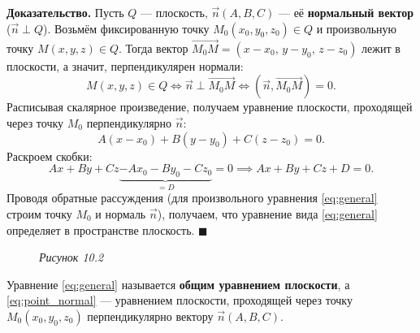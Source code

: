 \documentclass[12pt,a4paper]{article}
\newenvironment{myproof}{\noindent\textbf{Доказательство.}}{\hfill$\blacksquare$}
\begin{document}
\begin{myproof}
  Пусть $Q$ --- плоскость, $\vec{n}(A,B,C)$ --- её \textbf{нормальный
  вектор} ($\vec{n} \perp Q$). Возьмём фиксированную точку
  $M_0(x_0,y_0,z_0) \in Q$ и произвольную точку $M(x,y,z) \in Q$. Тогда
  вектор $\overrightarrow{M_0M} = (x-x_0,\, y-y_0,\, z-z_0)$ лежит в
  плоскости, а значит, перпендикулярен нормали:
  \[
    M(x,y,z) \in Q \iff \vec{n} \perp \overrightarrow{M_0M} \iff
    (\vec{n}, \overrightarrow{M_0M}) = 0.
  \]
  Расписывая скалярное произведение, получаем уравнение плоскости,
  проходящей через точку $M_0$ перпендикулярно $\vec{n}$:
  \begin{equation}
    A(x - x_0) + B(y - y_0) + C(z - z_0) = 0.
    \tag{10.2}\label{eq:point_normal}
  \end{equation}
  Раскроем скобки:
  \[
    Ax + By + Cz \underbrace{- Ax_0 - By_0 - Cz_0}_{= D} = 0
    \implies Ax + By + Cz + D = 0.
  \]
  Проводя обратные рассуждения (для произвольного уравнения
  \eqref{eq:general} строим точку $M_0$ и нормаль $\vec{n}$), получаем,
  что уравнение вида \eqref{eq:general} определяет в пространстве
  плоскость.
\end{myproof}

\begin{figure}[h!]
  \centering

  \smallskip
  \textit{Рисунок 10.2}
\end{figure}

\noindent Уравнение \eqref{eq:general} называется \textbf{общим
уравнением плоскости}, а \eqref{eq:point_normal} --- уравнением
плоскости, проходящей через точку $M_0(x_0,y_0,z_0)$ перпендикулярно
вектору $\vec{n}(A,B,C)$.
\end{document}
